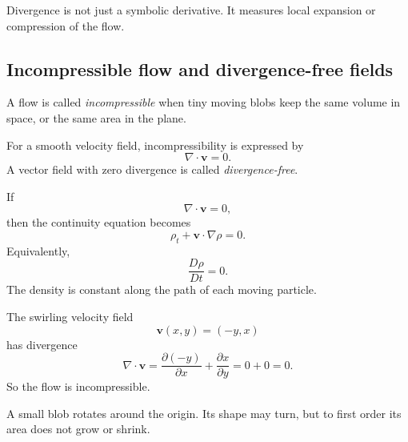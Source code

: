 Divergence is not just a symbolic derivative.  It measures local expansion or
compression of the flow.

\subsection{Incompressible flow and divergence-free fields}

A flow is called \emph{incompressible} when tiny moving blobs keep the same volume
in space, or the same area in the plane.

For a smooth velocity field, incompressibility is expressed by
\[
\boxed{
    \nabla\cdot\mathbf v=0.
}
\]
A vector field with zero divergence is called \emph{divergence-free}.

If
\[
    \nabla\cdot\mathbf v=0,
\]
then the continuity equation becomes
\[
\boxed{
    \rho_t+\mathbf v\cdot\nabla\rho=0.
}
\]
Equivalently,
\[
\boxed{
    \frac{D\rho}{Dt}=0.
}
\]
The density is constant along the path of each moving particle.

\begin{example}
The swirling velocity field
\[
    \mathbf v(x,y)=(-y,x)
\]
has divergence
\[
    \nabla\cdot\mathbf v
    =
    \frac{\partial(-y)}{\partial x}
    +
    \frac{\partial x}{\partial y}
    =
    0+0
    =
    0.
\]
So the flow is incompressible.

A small blob rotates around the origin.  Its shape may turn, but to first order its area
does not grow or shrink.
\end{example}

